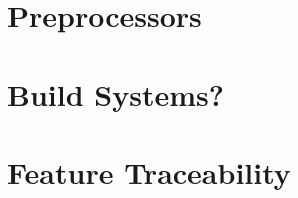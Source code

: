 

\subtitle{5. Techniques for Embedded Software}
\author{Author}





\section{Preprocessors}



\lessonslearned{
	\item \ldots
}{
	\item \ldots
}{
	\ldots
}

\sectionend

\section{Build Systems?}



\lessonslearned{
	\item \ldots
}{
	\item \ldots
}{
	\ldots
}

\sectionend

\section{Feature Traceability}



\lessonslearned{
	\item \ldots
}{
	\item \ldots
}{
	\ldots
}




